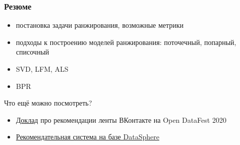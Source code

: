 \documentclass[fullscreen=true, bookmarks=true, hyperref={pdfencoding=unicode}]{beamer}
\begin{document}
\begin{frame}
  \frametitle{Резюме}

  \begin{itemize}
    \item постановка задачи ранжирования, возможные метрики
    \item подходы к построению моделей ранжирования: поточечный, попарный, списочный
    \item SVD, LFM, ALS
    \item BPR
  \end{itemize}

  \pause
  \vspace{1cm}
  Что ещё можно посмотреть?
  \begin{itemize}
    \item \href{https://youtu.be/2F5kTOiDuOg}{Доклад} про рекомендации ленты ВКонтакте на Open DataFest 2020
    \item \href{https://www.youtube.com/watch?v=oavkOOJMVK8}{Рекомендательная система на базе DataSphere}
  \end{itemize}
\end{frame}
\end{document}
